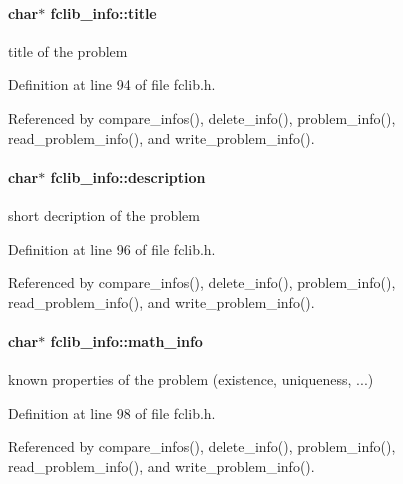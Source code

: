 \paragraph[{title}]{\setlength{\rightskip}{0pt plus 5cm}char$\ast$ fclib\+\_\+info\+::title}\label{structfclib__info_a4ea1b298e3aa7228a5f2a55f711f41d2}


title of the problem 



Definition at line 94 of file fclib.\+h.



Referenced by compare\+\_\+infos(), delete\+\_\+info(), problem\+\_\+info(), read\+\_\+problem\+\_\+info(), and write\+\_\+problem\+\_\+info().

\hypertarget{structfclib__info_a0c1680fee67eaf7b20c436a775d4f35d}{}
\paragraph[{description}]{\setlength{\rightskip}{0pt plus 5cm}char$\ast$ fclib\+\_\+info\+::description}\label{structfclib__info_a0c1680fee67eaf7b20c436a775d4f35d}


short decription of the problem 



Definition at line 96 of file fclib.\+h.



Referenced by compare\+\_\+infos(), delete\+\_\+info(), problem\+\_\+info(), read\+\_\+problem\+\_\+info(), and write\+\_\+problem\+\_\+info().

\hypertarget{structfclib__info_ad6dadb3af34a719e5ec3cab2d499c7f2}{}
\paragraph[{math\+\_\+info}]{\setlength{\rightskip}{0pt plus 5cm}char$\ast$ fclib\+\_\+info\+::math\+\_\+info}\label{structfclib__info_ad6dadb3af34a719e5ec3cab2d499c7f2}


known properties of the problem (existence, uniqueness, ...) 



Definition at line 98 of file fclib.\+h.



Referenced by compare\+\_\+infos(), delete\+\_\+info(), problem\+\_\+info(), read\+\_\+problem\+\_\+info(), and write\+\_\+problem\+\_\+info().

